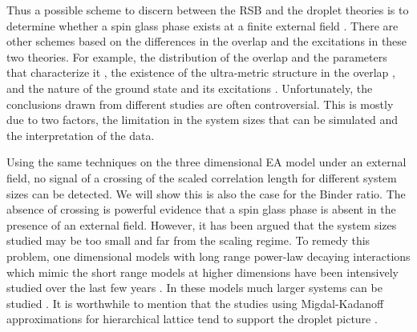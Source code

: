 \documentclass[aps,prb,twocolumn,showpacs,superscriptaddress]{revtex4}
\begin{document}
Thus a possible scheme to discern between the RSB and the droplet theories is to determine
whether a spin glass phase exists at a finite external field \cite{Young-Katzgraber2004}. 
There are other schemes based on the differences in the overlap and the excitations in these two theories. 
For example, the distribution of the overlap and the parameters that characterize it \cite{Hatano-Gubernatis-2002, 
Marinari-etal-1998,Marinari-etal-1999,Bokil-etal-1999,Moore-etal-1998,Monthus-Garel-2013}, 
the existence of the ultra-metric structure in the overlap \cite{Hed-Young-Domany-2004,Contucci-etal-2007}, 
and the nature of the ground state and its 
excitations \cite{Palassini-Young-2000a,Palassini-Young-2000b,Aspelmeier-Moore-Young-2003,Marinari-Parisi-2001,
Houdayer-Martin-1999,Marinari-Parisi-Zuliani-2000,Marinari-etal-1999}.
Unfortunately, the conclusions drawn from different studies are often controversial.  
This is mostly due to two factors, the limitation in the system sizes that can be 
simulated and the interpretation of the data. 

Using the same techniques on the three dimensional EA model under an external field, no signal of 
a crossing of the scaled correlation length for different system sizes can be 
detected\cite{Young-Katzgraber2004}.  We will show this is also 
the case for the Binder ratio.  The absence of crossing is powerful evidence that a spin
glass phase is absent in the presence of an external field. However, it has been 
argued that the system sizes studied may be too small and far from the scaling 
regime. To remedy this problem, one dimensional models with long range power-law 
decaying interactions \cite{Kotliar-Anderson-Stein-1983} which mimic the short range models 
at higher dimensions have been intensively studied over the last few years \cite{Katzgraber-Young-2003a,Katzgraber-Young-2003b,
Leuzzi-1999}. In these models much larger systems can be studied \cite{Katzgraber-Larson-Young-2009,
Katzgraber-Hartmann-2009,Leuzzi-etal-2008,Larson-etal-2013}. It is worthwhile to mention that
the studies using Migdal-Kadanoff approximations for hierarchical lattice
tend to support the droplet picture \cite{Moore-Bokil-Drossel-1998,Migliorini-Berker-1998}. 
\end{document}
